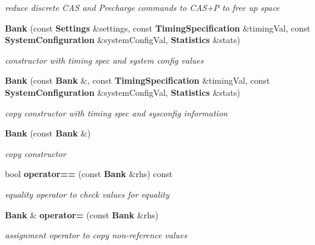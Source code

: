 \begin{DoxyCompactItemize}
\begin{DoxyCompactList}\small\item\em reduce discrete CAS and Precharge commands to CAS+P to free up space \item\end{DoxyCompactList}\item 
{\bf Bank} (const {\bf Settings} \&settings, const {\bf TimingSpecification} \&timingVal, const {\bf SystemConfiguration} \&systemConfigVal, {\bf Statistics} \&stats)\label{class_d_r_a_msim_i_i_1_1_bank_a2c48c0bd69bd3be45485ee31c1ddeff0}

\begin{DoxyCompactList}\small\item\em constructor with timing spec and system config values \item\end{DoxyCompactList}\item 
{\bf Bank} (const {\bf Bank} \&, const {\bf TimingSpecification} \&timingVal, const {\bf SystemConfiguration} \&systemConfigVal, {\bf Statistics} \&stats)\label{class_d_r_a_msim_i_i_1_1_bank_a7d0a8034459071ece65161188db4fa38}

\begin{DoxyCompactList}\small\item\em copy constructor with timing spec and sysconfig information \item\end{DoxyCompactList}\item 
{\bf Bank} (const {\bf Bank} \&)\label{class_d_r_a_msim_i_i_1_1_bank_a455d191c606241ace4ff939ae247185e}

\begin{DoxyCompactList}\small\item\em copy constructor \item\end{DoxyCompactList}\item 
bool {\bf operator==} (const {\bf Bank} \&rhs) const 
\begin{DoxyCompactList}\small\item\em equality operator to check values for equality \item\end{DoxyCompactList}\item 
{\bf Bank} \& {\bf operator=} (const {\bf Bank} \&rhs)
\begin{DoxyCompactList}\small\item\em assignment operator to copy non-\/reference values \item\end{DoxyCompactList}\end{DoxyCompactItemize}
